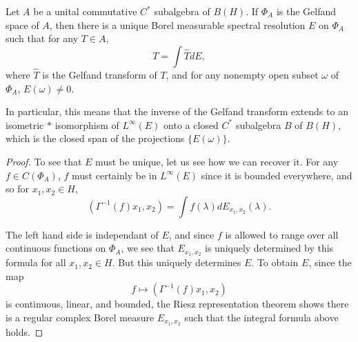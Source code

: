 \begin{theorem}
    Let $A$ be a unital commutative $C^*$ subalgebra of $B(H)$. If $\Phi_A$ is the Gelfand space of $A$, then there is a unique Borel measurable spectral resolution $E$ on $\Phi_A$ such that for any $T \in A$,
    \[ T = \int \widehat{T} dE, \]
    where $\widehat{T}$ is the Gelfand transform of $T$, and for any nonempty open subset $\omega$ of $\Phi_A$, $E(\omega) \neq 0$.

    In particular, this means that the inverse of the Gelfand transform extends to an isometric $*$ isomorphism of $L^\infty(E)$ onto a closed $C^*$ subalgebra $B$ of $B(H)$, which is the closed span of the projections $\{ E(\omega) \}$.
\end{theorem}
\begin{proof}
    To see that $E$ must be unique, let us see how we can recover it. For any $f \in C(\Phi_A)$, $f$ must certainly be in $L^\infty(E)$ since it is bounded everywhere, and so for $x_1,x_2 \in H$,
    \[ ( \Gamma^{-1}(f) x_1, x_2) = \int f(\lambda) dE_{x_1,x_2}(\lambda). \]

    The left hand side is independant of $E$, and since $f$ is allowed to range over all continuous functions on $\Phi_A$, we see that $E_{x_1,x_2}$ is uniquely determined by this formula for all $x_1,x_2 \in H$. But this uniquely determines $E$. To obtain $E$, since the map
    \[ f \mapsto (\Gamma^{-1}(f) x_1, x_2) \]
    is continuous, linear, and bounded, the Riesz representation theorem shows there is a regular complex Borel measure $E_{x_1,x_2}$ such that the integral formula above holds.


\end{proof}

